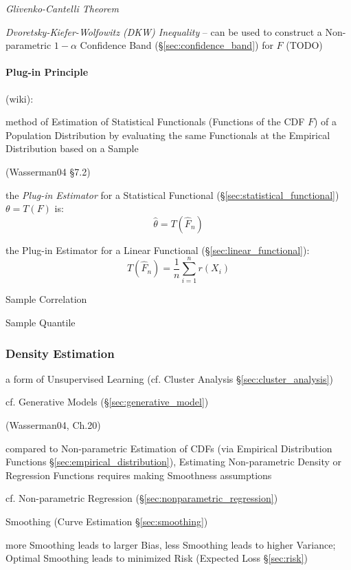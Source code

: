 \emph{Glivenko-Cantelli Theorem}

\emph{Dvoretsky-Kiefer-Wolfowitz (DKW) Inequality} -- can be used to construct a
Non-parametric $1-\alpha$ Confidence Band (\S\ref{sec:confidence_band}) for $F$
(TODO)



\paragraph{Plug-in Principle}\label{sec:plugin_principle}\hfill

(wiki):

method of Estimation of Statistical Functionals (Functions of the CDF $F$) of a
Population Distribution by evaluating the same Functionals at the Empirical
Distribution based on a Sample

(Wasserman04 \S7.2)

the \emph{Plug-in Estimator} for a Statistical Functional
(\S\ref{sec:statistical_functional}) $\theta = T(F)$ is:
\[
  \hat{\theta} = T(\hat{F}_n)
\]

the Plug-in Estimator for a Linear Functional (\S\ref{sec:linear_functional}):
\[
  T(\hat{F}_n) = \frac{1}{n}\sum_{i=1}^n r(X_i)
\]

Sample Correlation

Sample Quantile



\subsubsection{Density Estimation}\label{sec:density_estimation}

a form of Unsupervised Learning (cf. Cluster Analysis
\S\ref{sec:cluster_analysis})

\fist cf. Generative Models (\S\ref{sec:generative_model})

(Wasserman04, Ch.20)

compared to Non-parametric Estimation of CDFs (via Empirical Distribution
Functions \S\ref{sec:empirical_distribution}), Estimating Non-parametric Density
or Regression Functions requires making Smoothness assumptions

cf. Non-parametric Regression (\S\ref{sec:nonparametric_regression})

Smoothing (Curve Estimation \S\ref{sec:smoothing})

more Smoothing leads to larger Bias, less Smoothing leads to higher Variance;
Optimal Smoothing leads to minimized Risk (Expected Loss \S\ref{sec:risk})

